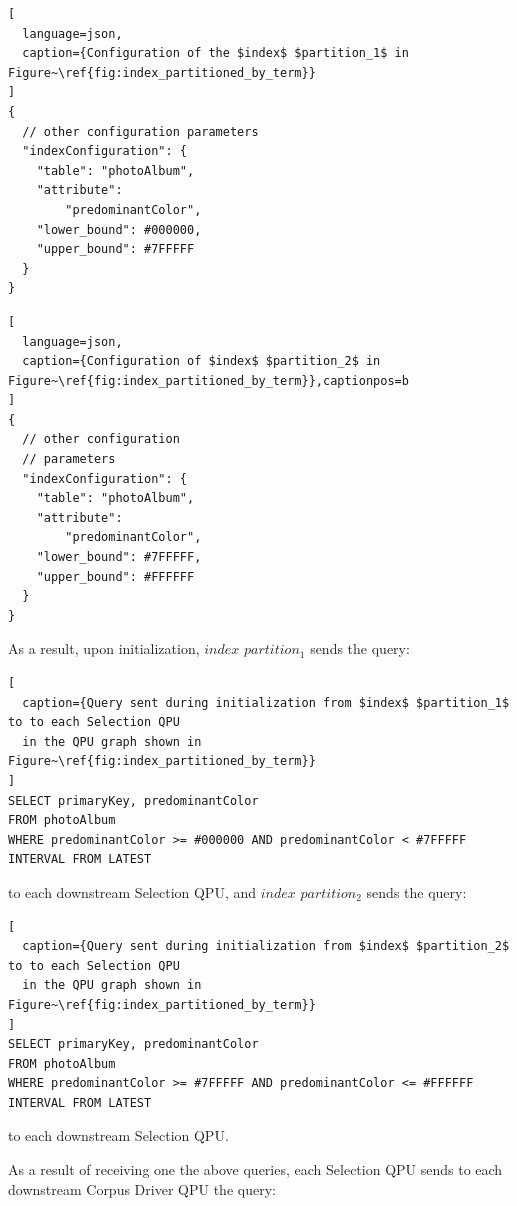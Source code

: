 \begin{minipage}{.45\textwidth}
\begin{lstlisting}[
  language=json,
  caption={Configuration of the $index$ $partition_1$ in Figure~\ref{fig:index_partitioned_by_term}}
]
{
  // other configuration parameters
  "indexConfiguration": {
    "table": "photoAlbum",
    "attribute":
        "predominantColor",
    "lower_bound": #000000,
    "upper_bound": #7FFFFF
  }
}
\end{lstlisting}
\end{minipage}\hfill
\begin{minipage}{.45\textwidth}
\begin{lstlisting}[
  language=json,
  caption={Configuration of $index$ $partition_2$ in Figure~\ref{fig:index_partitioned_by_term}},captionpos=b
]
{
  // other configuration
  // parameters
  "indexConfiguration": {
    "table": "photoAlbum",
    "attribute":
        "predominantColor",
    "lower_bound": #7FFFFF,
    "upper_bound": #FFFFFF
  }
}
\end{lstlisting}
\end{minipage}

\medskip
\noindent
As a result, upon initialization, $index$ $partition_1$ sends the query:

\begin{lstlisting}[
  caption={Query sent during initialization from $index$ $partition_1$ to to each Selection QPU
  in the QPU graph shown in Figure~\ref{fig:index_partitioned_by_term}}
]
SELECT primaryKey, predominantColor
FROM photoAlbum
WHERE predominantColor >= #000000 AND predominantColor < #7FFFFF
INTERVAL FROM LATEST
\end{lstlisting}

\noindent
to each downstream Selection QPU, and $index$ $partition_2$ sends the query:

\begin{lstlisting}[
  caption={Query sent during initialization from $index$ $partition_2$ to to each Selection QPU
  in the QPU graph shown in Figure~\ref{fig:index_partitioned_by_term}}
]
SELECT primaryKey, predominantColor
FROM photoAlbum
WHERE predominantColor >= #7FFFFF AND predominantColor <= #FFFFFF
INTERVAL FROM LATEST
\end{lstlisting}

\noindent
to each downstream Selection QPU.

\noindent
As a result of receiving one the above queries,
each Selection QPU sends to each downstream Corpus Driver QPU the query:


